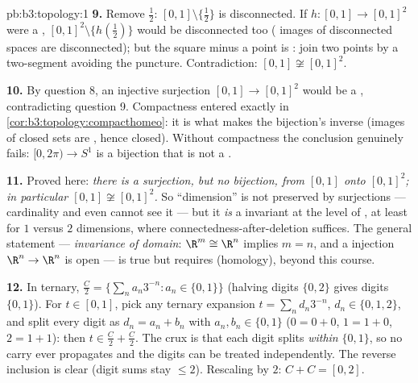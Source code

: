 \begin{solution}{pb:b3:topology:1}
\textbf{9.} Remove $\frac12$: $[0,1]\setminus\{\frac12\}$ is
disconnected. If $h \colon [0,1] \to [0,1]^2$ were a
, $[0,1]^2\setminus\{h(\frac12)\}$ would be
disconnected too ( images of disconnected spaces
are disconnected); but the square minus a point is
: join two points by a two-segment  avoiding
the puncture. Contradiction: $[0,1] \not\cong [0,1]^2$.

\textbf{10.} By question 8, an injective  surjection
$[0,1] \to [0,1]^2$ would be a , contradicting
question 9. Compactness entered exactly in
\cref{cor:b3:topology:compacthomeo}: it is what makes the
 bijection's inverse  (images of closed
sets are , hence closed). Without compactness the
conclusion genuinely fails: $[0, 2\pi) \to S^1$ is a 
bijection that is not a .

\textbf{11.} Proved here: \emph{there is a 
surjection, but no  bijection, from $[0,1]$ onto
$[0,1]^2$; in particular $[0,1] \not\cong [0,1]^2$.} So
``dimension'' is not preserved by  surjections ---
cardinality and even  cannot see it --- but it
\emph{is} a  invariant at the level of
, at least for $1$ versus $2$ dimensions, where
connectedness-after-deletion suffices. The general statement
--- \emph{invariance of domain}: $\R^m \cong \R^n$ implies $m =
n$, and a  injection $\R^n \to \R^n$ is open ---
is true but requires   (homology), beyond
this course.

\textbf{12.} In ternary, $\frac C2 = \{\sum_na_n3^{-n} : a_n
\in \{0, 1\}\}$ (halving digits $\{0,2\}$ gives digits
$\{0,1\}$). For $t \in [0,1]$, pick any ternary expansion $t =
\sum_nd_n3^{-n}$, $d_n \in \{0,1,2\}$, and split every digit
as $d_n = a_n + b_n$ with $a_n, b_n \in \{0,1\}$ ($0 = 0{+}0$,
$1 = 1{+}0$, $2 = 1{+}1$): then $t \in \frac C2 + \frac C2$.
The crux is that each digit splits \emph{within} $\{0,1\}$, so
no carry ever propagates and the digits can be treated
independently. The reverse inclusion is clear (digit sums stay
$\leq 2$). Rescaling by $2$: $C + C = [0,2]$.


\end{solution}
